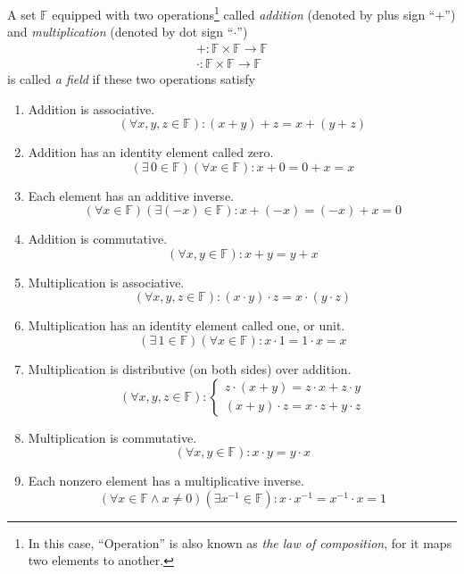 \begin{definition}[Field]
    A set $\mathbb{F}$ equipped with two operations\footnote{In this case, ``Operation'' is also known as \textit{the law of composition}, for it maps two elements to another.} called \textit{addition} (denoted by plus sign ``$+$'') and \textit{multiplication} (denoted by dot sign ``$\cdot$'')
    \[
        \begin{split}
            +: \mathbb{F}\times\mathbb{F}\to\mathbb{F} \\
            \cdot: \mathbb{F}\times\mathbb{F}\to\mathbb{F}
        \end{split}
    \]
    is called \textit{a field} if these two operations satisfy
    \begin{enumerate}[label = (\arabic*)]
        \item Addition is associative.
            \[
               (\forall x, y, z\in\mathbb{F}): (x + y) + z = x + (y + z)
            \]
        \item Addition has an identity element called zero.
            \[
                (\exists\,0\in\mathbb{F})(\forall x\in\mathbb{F}): x + 0 = 0 + x = x
            \]
        \item Each element has an additive inverse.
            \[
                (\forall x\in\mathbb{F})(\exists (-x)\in\mathbb{F}): x + (-x) = (-x) + x = 0
            \]
        \item Addition is commutative.
            \[
                (\forall x,y\in\mathbb{F}): x + y = y + x
            \]
        \item Multiplication is associative.
            \[
                (\forall x, y, z\in\mathbb{F}): (x\cdot y)\cdot z = x\cdot (y\cdot z)
            \]
        \item Multiplication has an identity element called one, or unit.
            \[
                (\exists\,1\in\mathbb{F})(\forall x\in\mathbb{F}): x\cdot 1 = 1\cdot x = x
            \]
        \item Multiplication is distributive (on both sides) over addition.
            \[
                (\forall x, y, z\in\mathbb{F}):
                \begin{cases}
                    z\cdot (x + y) = z\cdot x + z\cdot y \\
                    (x + y)\cdot z = x\cdot z + y\cdot z
                \end{cases}
            \]
        \item Multiplication is commutative.
            \[
                (\forall x, y\in\mathbb{F}): x\cdot y = y\cdot x
            \]
        \item Each nonzero element has a multiplicative inverse.
            \[
                (\forall x\in\mathbb{F} \wedge x\ne 0)(\exists x^{-1}\in\mathbb{F}): x\cdot x^{-1} = x^{-1}\cdot x = 1
            \]
    \end{enumerate}
\end{definition}

